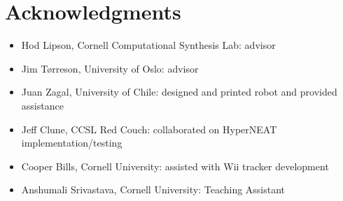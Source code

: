 \section{Acknowledgments}
\begin{itemize}
\item Hod Lipson, Cornell Computational Synthesis Lab: advisor
\item Jim T\o rreson, University of Oslo: advisor
\item Juan Zagal, University of Chile: designed and printed robot and provided assistance
\item Jeff Clune, CCSL Red Couch: collaborated on HyperNEAT implementation/testing
\item Cooper Bills, Cornell University: assisted with Wii tracker development
\item Anshumali Srivastava, Cornell University: Teaching Assistant
\end{itemize}

